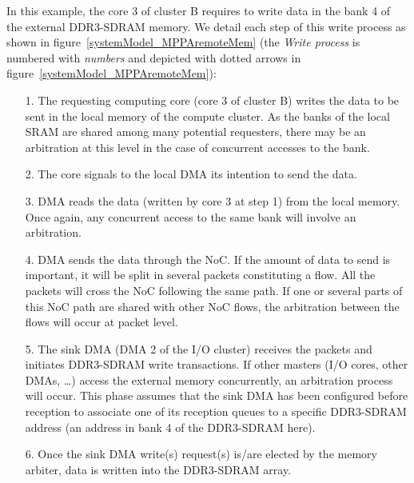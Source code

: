 \documentclass[main.tex]{subfiles}
\begin{document}
\begin{example}
    In this example, the core 3 of cluster B requires to write data in the bank
    4 of the external DDR3-SDRAM memory. We detail each step of this write
    process as shown in figure~\ref{systemModel_MPPAremoteMem} 
    (the \emph{Write process} is numbered with \emph{numbers} and depicted with
    dotted arrows in figure~\ref{systemModel_MPPAremoteMem}):
    \begin{enumerate}
        \item[1.] The requesting computing core (core 3 of cluster B) writes
            the data to be sent in the local memory of the compute cluster. As
            the banks of the local SRAM are shared among many potential
            requesters, there may be an arbitration at this level in the case
            of concurrent accesses to the bank. 
        \item[2.] The core signals to the local DMA its intention to send the
            data.
        \item[3.] DMA reads the data (written by core 3 at step 1) from the
            local memory. Once again, any concurrent access to the same bank
            will involve an arbitration.
        \item[4.] DMA sends the data through the NoC. If the amount of data to
            send is important, it will be split in several packets constituting
            a flow. All the packets will cross the NoC following the same path.
            If one or several parts of this NoC path are shared with other NoC
            flows, the arbitration between the flows will occur at packet
            level.
        \item[5.] The sink DMA (DMA 2 of the I/O cluster) receives the packets
            and initiates DDR3-SDRAM write transactions. If other masters (I/O
            cores, other DMAs, \ldots) access the external memory concurrently,
            an arbitration process will occur. This phase assumes that the sink
            DMA has been configured before reception to associate one of its
            reception queues to a specific DDR3-SDRAM address (an address in
            bank 4 of the DDR3-SDRAM here). 
        \item[6.] Once the sink DMA write(s) request(s) is/are elected by the
            memory arbiter, data is written into the DDR3-SDRAM array.
    \end{enumerate}
\end{example}
\end{document}
